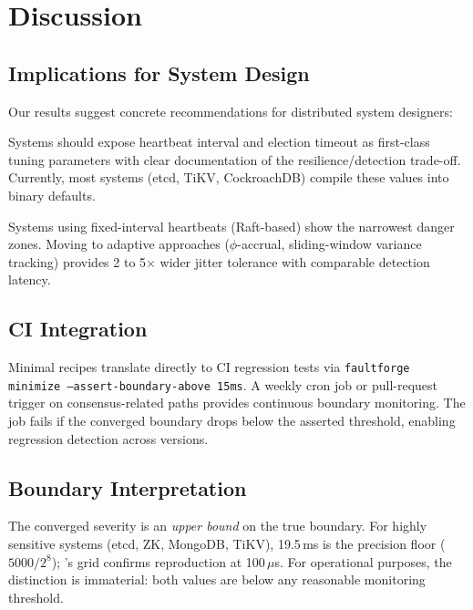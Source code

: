 \section{Discussion}
\label{sec:discussion}

\subsection{Implications for System Design}

Our results suggest concrete recommendations for distributed system designers:

 Systems should expose heartbeat
interval and election timeout as first-class tuning parameters with clear
documentation of the resilience/detection trade-off. Currently, most systems
(etcd, TiKV, CockroachDB) compile these values into binary defaults.

 Systems using fixed-interval heartbeats
(Raft-based) show the narrowest danger zones. Moving to adaptive approaches
($\phi$-accrual, sliding-window variance tracking) provides 2 to 5$\times$
wider jitter tolerance with comparable detection latency.

\subsection{CI Integration}
\label{sec:ci-integration}

Minimal recipes translate directly to CI regression tests via
\texttt{faultforge minimize --assert-boundary-above 15ms}. A weekly cron job
or pull-request trigger on consensus-related paths provides continuous
boundary monitoring. The job fails if the converged boundary drops below the
asserted threshold, enabling regression detection across versions.

\subsection{Boundary Interpretation}
\label{sec:interpretation}

The converged severity is an \emph{upper bound} on the true boundary.
For highly sensitive systems (etcd, ZK, MongoDB, TiKV), 19.5\,ms is the
precision floor ($5000/2^8$); \xinda{}'s grid confirms reproduction at
100\,$\mu$s. For operational purposes, the distinction is immaterial:
both values are below any reasonable monitoring threshold.

